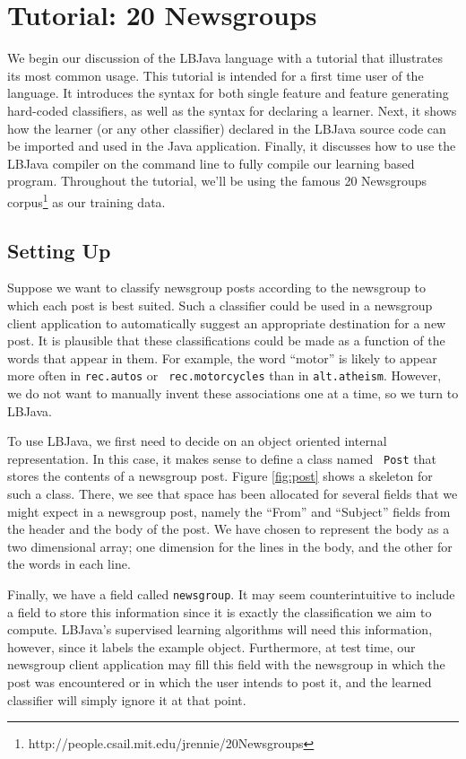 
\chapter{Tutorial: 20 Newsgroups}

We begin our discussion of the LBJava language with a tutorial that illustrates
its most common usage.  This tutorial is intended for a first time user of the
language.  It introduces the syntax for both single feature and feature
generating hard-coded classifiers, as well as the syntax for declaring a
learner.  Next, it shows how the learner (or any other classifier) declared in
the LBJava source code can be imported and used in the Java application.
Finally, it discusses how to use the LBJava compiler on the command line to fully
compile our learning based program.  Throughout the tutorial, we'll be using
the famous 20 Newsgroups
corpus\footnote{http://people.csail.mit.edu/jrennie/20Newsgroups} as our
training data.

\section{Setting Up}

Suppose we want to classify newsgroup posts according to the newsgroup to
which each post is best suited.  Such a classifier could be used in a
newsgroup client application to automatically suggest an appropriate
destination for a new post.  It is plausible that these classifications could
be made as a function of the words that appear in them.  For example, the word
``motor'' is likely to appear more often in {\tt rec.autos} or {\tt
rec.motorcycles} than in {\tt alt.atheism}.  However, we do not want to
manually invent these associations one at a time, so we turn to LBJava.

To use LBJava, we first need to decide on an object oriented internal
representation.  In this case, it makes sense to define a class named {\tt
Post} that stores the contents of a newsgroup post.  Figure \ref{fig:post}
shows a skeleton for such a class.  There, we see that space has been
allocated for several fields that we might expect in a newsgroup post, namely
the ``From'' and ``Subject'' fields from the header and the body of the post.
We have chosen to represent the body as a two dimensional array; one dimension
for the lines in the body, and the other for the words in each line.

Finally, we have a field called {\tt newsgroup}.  It may seem counterintuitive
to include a field to store this information since it is exactly the
classification we aim to compute.  LBJava's supervised learning algorithms will
need this information, however, since it labels the example object.
Furthermore, at test time, our newsgroup client application may fill this
field with the newsgroup in which the post was encountered or in which the
user intends to post it, and the learned classifier will simply ignore it at
that point.

